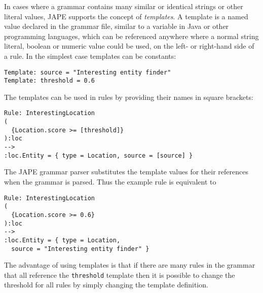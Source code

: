 In cases where a grammar contains many similar or identical strings or other
literal values, JAPE supports the concept of {\it templates}.  A template is a
named value declared in the grammar file, similar to a variable in Java or
other programming languages, which can be referenced anywhere where a normal
string literal, boolean or numeric value could be used, on the left- or
right-hand side of a rule.  In the simplest case templates can be constants:
\begin{small}
\begin{verbatim}
Template: source = "Interesting entity finder"
Template: threshold = 0.6
\end{verbatim}
\end{small}
%
The templates can be used in rules by providing their names in square brackets:
\begin{small}
\begin{verbatim}
Rule: InterestingLocation
(
  {Location.score >= [threshold]}
):loc
-->
:loc.Entity = { type = Location, source = [source] }
\end{verbatim}
\end{small}
%
The JAPE grammar parser substitutes the template values for their references
when the grammar is parsed.  Thus the example rule is equivalent to
\begin{small}
\begin{verbatim}
Rule: InterestingLocation
(
  {Location.score >= 0.6}
):loc
-->
:loc.Entity = { type = Location,
  source = "Interesting entity finder" }
\end{verbatim}
\end{small}
%
The advantage of using templates is that if there are many rules in the grammar
that all reference the {\tt threshold} template then it is possible to change
the threshold for all rules by simply changing the template definition.

